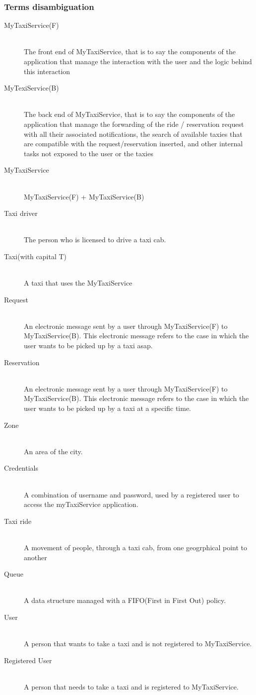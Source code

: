 \documentclass[11pt]{article} %
\begin{document}
        \subsubsection{Terms disambiguation}
        \begin{description}
         	\item [MyTaxiService(F)] \hfill \\The front end of MyTaxiService, that is to say the components
          	of the application that manage the interaction with the user and the logic behind
          	this interaction
        	\item [MyTexiService(B)]\hfill \\ The back end of MyTaxiService, that is to say the components
          	of the application that manage the forwarding of the ride / reservation request with all
          	their associated notifications, the search of available taxies that are compatible with the request/reservation inserted, and other internal
          	tasks not exposed to the user or the taxies
        	\item  [MyTaxiService] \hfill \\MyTaxiService(F) + MyTaxiService(B)
        	\item [Taxi driver] \hfill \\The person who is licensed to drive a taxi cab.
        	\item [Taxi(with capital T)]\hfill \\A taxi that uses the MyTaxiService
        	\item [Request] \hfill \\An electronic message sent by a user through MyTaxiService(F)
          	to MyTaxiService(B). This electronic message refers to the case in which the user wants to be picked up by a taxi asap.
        	\item [Reservation]\hfill \\ An electronic message sent by a user through MyTaxiService(F)
           to MyTaxiService(B). This electronic message refers to the case in which the user wants to be picked up by a taxi at a specific time.
        	\item [Zone] \hfill \\An area of the city.
         	\item [Credentials]\hfill \\ A combination of username and password, used by a registered user to access the myTaxiService application.
        	\item [Taxi ride] \hfill \\A movement of people, through a taxi cab, from one geogrphical point to another
        	\item [Queue] \hfill \\A data structure managed with a FIFO(First in First Out) policy.
       	\item [User] \hfill \\A person that wants to take a taxi and is not registered to MyTaxiService.
       	\item [Registered User] \hfill \\A person that needs to take a taxi and is registered to MyTaxiService.
       \end{description}
\end{document}

